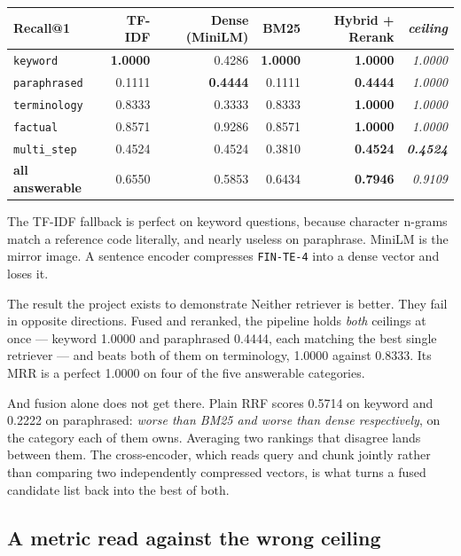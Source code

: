 \documentclass[11pt,a4paper]{article}
\newcommand{\code}[1]{\texttt{\small #1}}
\begin{document}
\begin{center}
\small
\begin{tabular}{@{}lrrrrr@{}}
\toprule
\textbf{Recall@1} & \textbf{TF-IDF} & \textbf{Dense (MiniLM)} & \textbf{BM25} & \textbf{Hybrid + Rerank} & \textit{ceiling} \\
\midrule
\code{keyword}     & \textbf{1.0000} & 0.4286 & \textbf{1.0000} & \textbf{1.0000} & \textit{1.0000} \\
\code{paraphrased} & 0.1111 & \textbf{0.4444} & 0.1111 & \textbf{0.4444} & \textit{1.0000} \\
\code{terminology} & 0.8333 & 0.3333 & 0.8333 & \textbf{1.0000} & \textit{1.0000} \\
\code{factual}     & 0.8571 & 0.9286 & 0.8571 & \textbf{1.0000} & \textit{1.0000} \\
\code{multi\_step} & 0.4524 & 0.4524 & 0.3810 & \textbf{0.4524} & \textit{\textbf{0.4524}} \\
\midrule
\textbf{all answerable} & 0.6550 & 0.5853 & 0.6434 & \textbf{0.7946} & \textit{0.9109} \\
\bottomrule
\end{tabular}
\end{center}

The TF-IDF fallback is perfect on keyword questions, because character n-grams
match a reference code literally, and nearly useless on paraphrase. MiniLM is the
mirror image. A sentence encoder compresses \code{FIN-TE-4} into a dense vector
and loses it.

\begin{finding}{The result the project exists to demonstrate}
Neither retriever is better. They fail in opposite directions. Fused and
reranked, the pipeline holds \emph{both} ceilings at once --- keyword 1.0000 and
paraphrased 0.4444, each matching the best single retriever --- and beats both of
them on terminology, 1.0000 against 0.8333. Its MRR is a perfect 1.0000 on four
of the five answerable categories.
\end{finding}

And fusion alone does not get there. Plain RRF scores 0.5714 on keyword and
0.2222 on paraphrased: \emph{worse than BM25 and worse than dense respectively},
on the category each of them owns. Averaging two rankings that disagree lands
between them. The cross-encoder, which reads query and chunk jointly rather than
comparing two independently compressed vectors, is what turns a fused candidate
list back into the best of both.

\subsection{A metric read against the wrong ceiling}
\end{document}
